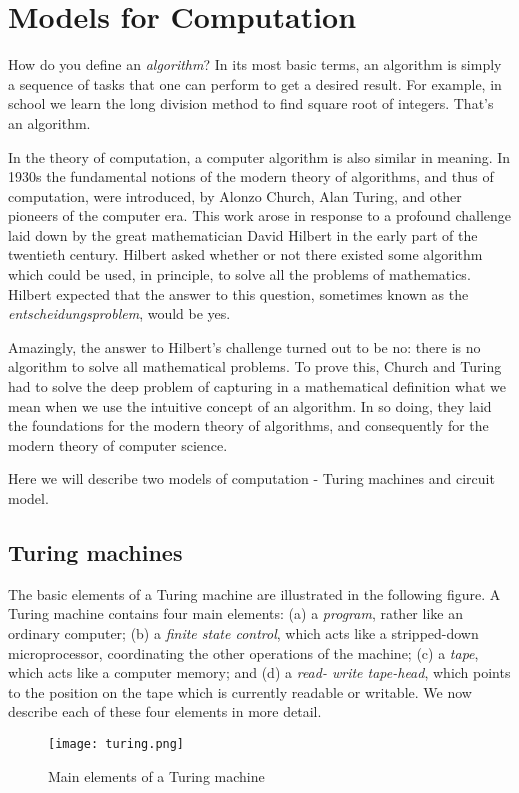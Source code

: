 \section{Models for Computation}
How do you define an \textit{algorithm}? In its most basic terms, an algorithm is simply a sequence of tasks that one can perform to get a desired result. For example, in school we learn the long division method to find square root of integers. That's an algorithm.
\vspace{1em}

In the theory of computation, a computer algorithm is also similar in meaning. In 1930s the fundamental notions of the modern theory of algorithms, and thus of computation, were introduced, by Alonzo Church, Alan Turing, and other pioneers of the computer era. This work arose in response to a profound challenge laid down by the great mathematician David Hilbert in the early part of the twentieth century. Hilbert asked whether or not there existed some algorithm which could be used, in principle, to solve all the problems of mathematics. Hilbert expected that the answer to this question, sometimes known as the \textit{entscheidungsproblem}, would be yes.
\vspace{1em}

Amazingly, the answer to Hilbert’s challenge turned out to be no: there is no algorithm to solve all mathematical problems. To prove this, Church and Turing had to solve the deep problem of capturing in a mathematical definition what we mean when we use the intuitive concept of an algorithm. In so doing, they laid the foundations for the modern theory of algorithms, and consequently for the modern theory of computer science.
\vspace{1em}

Here we will describe two models of computation - Turing machines and circuit model.

\subsection{Turing machines}
The basic elements of a Turing machine are illustrated in the following figure. A Turing machine contains four main elements: (a) a \textit{program}, rather like an ordinary computer; (b) a \textit{finite state control}, which acts like a stripped-down microprocessor, coordinating the other operations of the machine; (c) a \textit{tape}, which acts like a computer memory; and (d) a \textit{read- write tape-head}, which points to the position on the tape which is currently readable or writable. We now describe each of these four elements in more detail.
\begin{figure}[h]
    \centering
    \texttt{[image: turing.png]}
    \caption{Main elements of a Turing machine}
\end{figure}
\vspace{1em}

